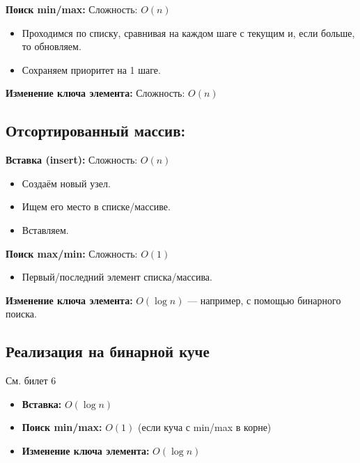 \textbf{Поиск min/max:} Сложность: $O(n)$ 
\begin{itemize}
	\item Проходимся по списку, сравнивая на каждом шаге с текущим и, если больше, то обновляем.
	\item Сохраняем приоритет на 1 шаге.
\end{itemize}

\textbf{Изменение ключа элемента:} Сложность: $O(n)$ 

\subsection{Отсортированный массив:}

\textbf{Вставка (insert):} Сложность: $O(n)$ 
\begin{itemize}
	\item Создаём новый узел.
	\item Ищем его место в списке/массиве.
	\item Вставляем.
\end{itemize}

\textbf{Поиск max/min:} Сложность: $O(1)$ 
\begin{itemize}
	\item Первый/последний элемент списка/массива.
\end{itemize}

\textbf{Изменение ключа элемента:} $O(\log n)$ --- например, с помощью бинарного поиска.

\subsection{Реализация на бинарной куче }

См. билет 6

\begin{itemize}
	\item \textbf{Вставка:} $O(\log n)$ 
	\item \textbf{Поиск min/max:} $O(1)$ (если куча с min/max в корне) 
	\item \textbf{Изменение ключа элемента:} $O(\log n)$ 
\end{itemize}
